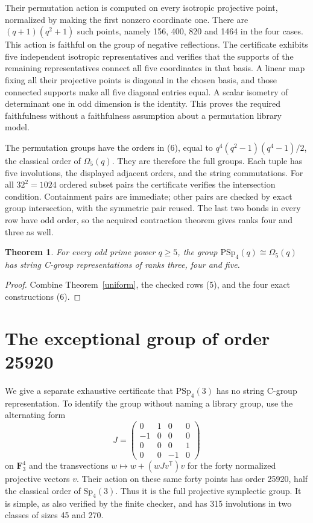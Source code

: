 \documentclass[11pt,a4paper]{article}
\newtheorem{theorem}{Theorem}
\newcommand{\F}{\mathbf F}
\newcommand{\Om}{\Omega}
\begin{document}
Their permutation action is computed on every isotropic
projective point, normalized by making the first nonzero
coordinate one. There are $(q+1)(q^2+1)$ such points, namely
156, 400, 820 and 1464 in the four cases. This action is faithful
on the group of negative reflections. The certificate exhibits
five independent isotropic representatives and verifies that
the supports of the remaining representatives connect all five
coordinates in that basis. A linear map fixing all their
projective points is diagonal in the chosen basis, and those
connected supports make all five diagonal entries equal. A
scalar isometry of determinant one in odd dimension is the
identity. This proves the required faithfulness without a
faithfulness assumption about a permutation library model.

The permutation groups have the orders in (6), equal to
$q^4(q^2-1)(q^4-1)/2$, the classical order of $\Om_5(q)$.
They are therefore the full groups. Each tuple has five
involutions, the displayed adjacent orders, and the string
commutations. For all $32^2=1024$ ordered subset pairs the
certificate verifies the intersection condition. Containment
pairs are immediate; other pairs are checked by exact group
intersection, with the symmetric pair reused. The last two
bonds in every row have odd order, so the acquired contraction
theorem gives ranks four and three as well.

\begin{theorem}\label{positive}
For every odd prime power $q\ge5$, the group
$\mathrm{PSp}_4(q)\cong\Om_5(q)$ has string C-group
representations of ranks three, four and five.
\end{theorem}
\begin{proof}
Combine Theorem~\ref{uniform}, the checked rows (5), and the
four exact constructions (6).
\end{proof}

\section{The exceptional group of order 25920}
We give a separate exhaustive certificate that
$\mathrm{PSp}_4(3)$ has no string C-group representation.
To identify the group without naming a library group, use the
alternating form
\[
 J=\begin{pmatrix}0&1&0&0\\-1&0&0&0\\
                  0&0&0&1\\0&0&-1&0\end{pmatrix}
\]
on $\F_3^4$ and the transvections
$w\mapsto w+(wJv^{\mathsf T})v$ for the forty normalized
projective vectors $v$. Their action on these same forty
points has order 25920, half the classical order of
$\mathrm{Sp}_4(3)$. Thus it is the full projective symplectic
group. It is simple, as also verified by the finite checker,
and has 315 involutions in two classes of sizes 45 and 270.
\end{document}
